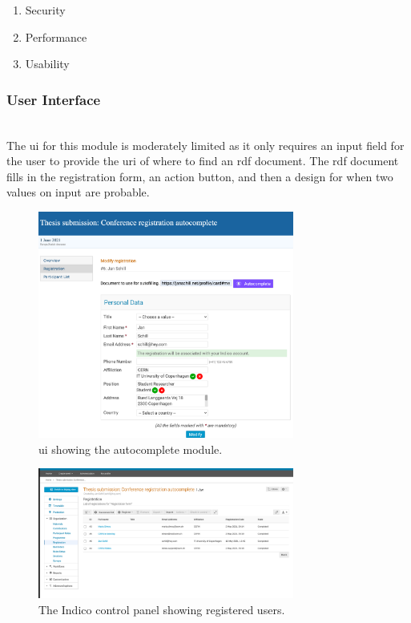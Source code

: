 \begin{enumerate}
    \item Security
    \item Performance
    \item Usability
\end{enumerate}

\subsubsection{User Interface}\mbox{}\\

The \gls{ui} for this module is moderately limited as it only requires an input field for the user to provide the \gls{uri} of where to find an \gls{rdf} document. The \gls{rdf} document fills in the registration form, an action button, and then a design for when two values on input are probable.

\begin{figure}[H]
    \centering
    \includegraphics[width=0.75\textwidth]{prototype/poc-solid-autocomplete-conference-registration.png}
    \caption{\gls{ui} showing the autocomplete module.}
    \label{fig:poc-solid-autocomplete-conference-registration}
\end{figure}

\begin{figure}[H]
    \centering
    \includegraphics[width=0.75\textwidth]{prototype/poc-solid-autocomplete-conference-registration-attendees.png}
    \caption{The Indico control panel showing registered users.}
    \label{fig:poc-solid-autocomplete-conference-registration-attendees}
\end{figure}

